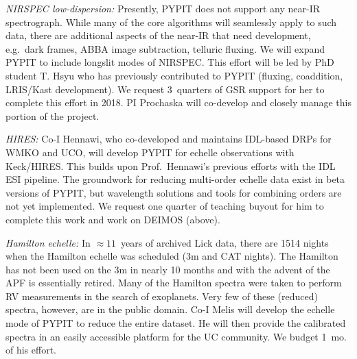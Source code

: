 \documentclass[12pt,preprint]{aastex}
\begin{document}
\vskip 0.05in

\noindent 
{\it NIRSPEC low-dispersion:} 
Presently, PYPIT does not support any near-IR spectrograph.
While many of the core algorithms will seamlessly apply to 
such data, there are additional aspects of the near-IR that
need development, e.g.\  dark frames, ABBA image subtraction,
telluric fluxing.  We will expand PYPIT to include longslit
modes of NIRSPEC.  This effort will be led by PhD student
T. Hsyu who has previously contributed to PYPIT
(fluxing, coaddition, LRIS/Kast development).
We request 3~quarters of GSR support for her to 
complete this effort in 2018.  PI Prochaska will co-develop
and closely manage this portion of the project.


\vskip 0.05in


\noindent 
{\it HIRES:} 
Co-I Hennawi, who co-developed and maintains 
IDL-based DRPs for WMKO and UCO, will develop PYPIT 
for echelle observations with Keck/HIRES.
This builds upon Prof.\ Hennawi's previous efforts
with the IDL ESI pipeline. The groundwork for reducing
multi-order echelle data exist in beta versions of PYPIT, but
wavelength solutions and tools for combining orders are not 
yet implemented. 
We request one quarter of teaching buyout for 
him to complete this work and work on DEIMOS (above). 


\vskip 0.05in

\noindent 
{\it Hamilton echelle:}   In $\approx 11$~years of archived
Lick data, there are 1514 nights when the
Hamilton echelle was scheduled (3m and CAT nights). 
The Hamilton has not been used
on the 3m in nearly 10 months and with the advent of the APF is
essentially retired. Many of the Hamilton spectra
were taken to perform RV measurements
in the search of exoplanets.  Very few of these
(reduced) spectra, however, are in the public domain.
Co-I Melis will develop the echelle mode of PYPIT
to reduce the entire dataset.  He will then provide
the calibrated spectra in an easily accessible platform
for the UC community.  We budget 1~mo. of his effort.
\end{document}

